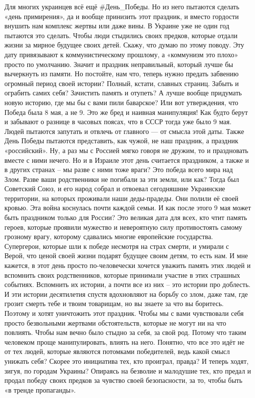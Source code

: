 {Для многих украинцев всё ещё #День_Победы. Но из него пытаются сделать «день примирения», да и вообще принизить этот праздник, и вместо гордости внушить нам комплекс жертвы или даже вины. В Украине уже не один год пытаются это сделать. Чтобы люди стыдились своих предков, которые отдали жизни за мирное будущее своих детей.
Скажу, что думаю по этому поводу. 
Эту дату привязывают к коммунистическому прошлому, а «коммунизм это плохо» просто по умолчанию. Значит и праздник неправильный, который лучше бы вычеркнуть из памяти. Но постойте, нам что, теперь нужно предать забвению огромный период своей истории? Полный, кстати, славных страниц. Забыть и ограбить самих себя? Зачистить память и отупеть? А лучше вообще придумать новую историю, где мы бы с вами пили баварское? 
Или вот утверждения, что Победа была 8 мая, а не 9. Это же бред и наивная манипуляция! Как будто берут и забывают о разнице в часовых поясах, что в СССР тогда уже было 9 мая. Людей пытаются запутать и отвлечь от главного — от смысла этой даты. 
Также День Победы пытаются представить, как чужой, не наш праздник, а праздник «российский». Ну, а раз мы с Россией мягко говоря не дружим, то и праздновать вместе с ними нечего. Но и в Израиле этот день считается праздником, а также и в других странах – мы разве с ними тоже враги? Это победа всего мира над Злом. 
Разве ваши родственники не погибали за эти земли, или как? Тогда был Советский Союз, и его народ собрал и отвоевал сегодняшние Украинские территории, на которых проживали наши деды-прадеды. Они полили её своей кровью. Эта война коснулась почти каждой семьи.
И как после этого 9 мая может быть праздником только для России? Это великая дата для всех, кто чтит память героев, которые проявили мужество и невероятную силу противостоять самому грозному врагу, которому сдавались многие европейские государства.
 Супергерои, которые шли к победе несмотря на страх смерти, и умирали с Верой, что ценой своей жизни подарят будущее своим детям, то есть нам.
 И мне кажется, в этот день просто по-человечески хочется уважить память этих людей и вспомнить своих родственников, которые принимали участие в этих страшных событиях. Вспомнить их истории, а почти все из них – это истории про доблесть.
 И эти истории десятилетия спустя вдохновляют на борьбу со злом, даже там, где грозит смерть тебе и твоим товарищам, но вы знаете за что вы боритесь. Поэтому и хотят уничтожить этот праздник. Чтобы мы с вами чувствовали себя просто безвольными жертвами обстоятельств, которые не могут ни на что повлиять.
 Чтобы нам вечно было стыдно за себя, за свой род. Потому что таким человеком проще манипулировать, влиять на него. Понятно, что все это идёт не от тех людей, которые являются потомками победителей, ведь какой смысл унижать себя? Скорее это инициатива тех, кто проиграл, правда? И теперь ходят, зигуя, по городам Украины? Опираясь на безволие и малодушие тех, кто предал и продал победу своих предков за чувство своей безопасности, за то, чтобы быть «в тренде пропаганды». 
}
